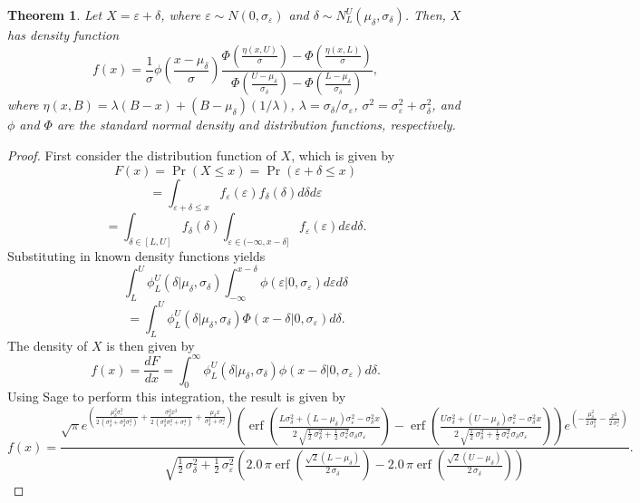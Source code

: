 \documentclass{article}
\newtheorem{theorem}{Theorem}
\newcommand{\ep}{\varepsilon}
\begin{document}
\begin{theorem}
	Let $X = \ep + \delta$, where $\ep\sim N(0, \sigma_\ep)$ and $\delta\sim N_L^U(\mu_\delta, \sigma_\delta)$. Then, $X$ has density function 
	$$f(x) = \frac{1}{\sigma}\phi\left(\frac{x - \mu_\delta}{\sigma}\right) \frac{\Phi\left(\frac{\eta(x, U)}{\sigma}\right) - \Phi\left(\frac{\eta(x, L)}{\sigma}\right)}{\Phi\left(\frac{U - \mu_\delta}{\sigma_\delta}\right) - \Phi\left(\frac{L - \mu_\delta}{\sigma_\delta}\right)},$$
	where $\eta(x, B) = \lambda (B - x) + (B - \mu_\delta) (1 / \lambda)$, $\lambda = \sigma_\delta / \sigma_\ep$, $\sigma^2 = \sigma_\ep^2 + \sigma_\delta^2$, and $\phi$ and $\Phi$ are the standard normal density and distribution functions, respectively.
\end{theorem}
\begin{proof}
		First consider the distribution function of $X$, which is given by
	$$F(x) = \Pr(X \leq x) = \Pr(\ep + \delta \leq x)$$
	$$= \int_{\ep + \delta \leq x} f_\ep(\ep) f_\delta(\delta) d\delta d\ep$$
	$$= \int_{\delta\in[L, U]} f_\delta(\delta) \int_{\ep\in (-\infty, x - \delta]} f_\ep(\ep) d\ep d\delta.$$
	Substituting in known density functions yields
	$$\int_L^U \phi_L^U(\delta | \mu_\delta, \sigma_\delta) \int_{-\infty}^{x - \delta} \phi(\ep | 0, \sigma_\ep) d\ep d\delta$$
	$$= \int_L^U \phi_L^U(\delta | \mu_\delta, \sigma_\delta) \Phi(x - \delta | 0, \sigma_\ep) d\delta.$$
	The density of $X$ is then given by
	$$f(x) = \frac{dF}{dx} = \int_0^\infty \phi_L^U(\delta | \mu_\delta, \sigma_\delta) \phi(x - \delta | 0, \sigma_\ep) d\delta.$$
	Using Sage to perform this integration, the result is given by
	$$f(x) = \frac{{\sqrt{\pi} e^{\left(\frac{\mu_{\delta}^{2} \sigma_{\ep}^{2}}{2 \, {\left(\sigma_{\delta}^{4} + \sigma_{\delta}^{2} \sigma_{\ep}^{2}\right)}} + \frac{\sigma_{\delta}^{2} x^{2}}{2 \, {\left(\sigma_{\delta}^{2} \sigma_{\ep}^{2} + \sigma_{\ep}^{4}\right)}} + \frac{\mu_{\delta} x}{\sigma_{\delta}^{2} + \sigma_{\ep}^{2}}\right)} \left( \operatorname{erf}\left(\frac{L \sigma_{\delta}^{2} + {\left(L - \mu_{\delta}\right)} \sigma_{\ep}^{2} - \sigma_{\delta}^{2} x}{2 \, \sqrt{\frac{1}{2} \, \sigma_{\delta}^{2} + \frac{1}{2} \, \sigma_{\ep}^{2}} \sigma_{\delta} \sigma_{\ep}}\right)  - \operatorname{erf}\left(\frac{U \sigma_{\delta}^{2} + {\left(U - \mu_{\delta}\right)} \sigma_{\ep}^{2} - \sigma_{\delta}^{2} x}{2 \, \sqrt{\frac{1}{2} \, \sigma_{\delta}^{2} + \frac{1}{2} \, \sigma_{\ep}^{2}} \sigma_{\delta} \sigma_{\ep}}\right) \right)} e^{\left(-\frac{\mu_{\delta}^{2}}{2 \, \sigma_{\delta}^{2}} - \frac{x^{2}}{2 \, \sigma_{\ep}^{2}}\right)}}{\sqrt{\frac{1}{2} \, \sigma_{\delta}^{2} + \frac{1}{2} \, \sigma_{\ep}^{2}} {\left(2.0 \, \pi \operatorname{erf}\left(\frac{\sqrt{2} {\left(L - \mu_{\delta}\right)}}{2 \, \sigma_{\delta}}\right) - 2.0 \, \pi \operatorname{erf}\left(\frac{\sqrt{2} {\left(U - \mu_{\delta}\right)}}{2 \, \sigma_{\delta}}\right)\right)}}.$$

\end{proof}
\end{document}
